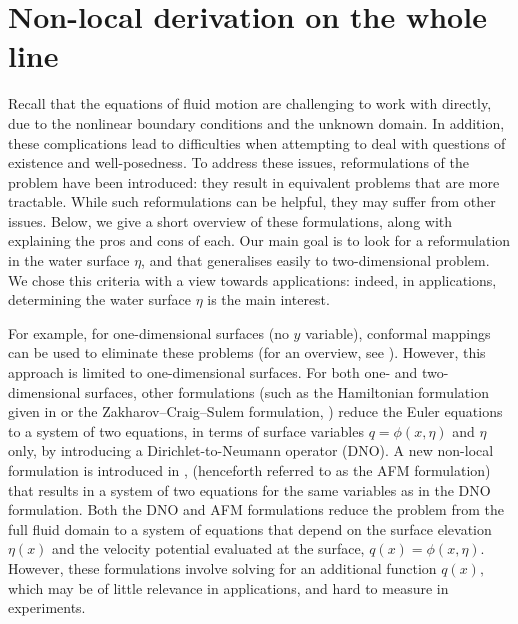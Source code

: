 
\chapter{Non-local derivation on the whole line} %

\label{Chapter3} %

Recall that the equations of fluid motion are challenging to work with directly, due to the nonlinear boundary conditions and the unknown domain. In addition, these complications lead to difficulties when attempting to deal with questions of existence and well-posedness. To address these issues, reformulations of the problem have been introduced: they result in equivalent problems that are more tractable. While such reformulations can be helpful, they may suffer from other issues. Below, we give a short overview of these formulations, along with explaining the pros and cons of each. Our main goal is to look for a reformulation in the water surface $\eta$, and that generalises easily to two-dimensional problem. We chose this criteria with a view towards applications: indeed, in applications, determining the water surface $\eta$ is the main interest.

For example, for one-dimensional surfaces (no $y$ variable), conformal mappings can be used to eliminate these problems (for an overview, see \cite{DKSZ1996}). However, this approach is limited to one-dimensional surfaces. For both one- and two-dimensional surfaces, other formulations (such as the Hamiltonian formulation given in  \cite{Zakharov} or the Zakharov–Craig–Sulem formulation, \cite{CS1993}) reduce the Euler equations to a system of two equations, in terms of surface variables $q = \phi(x, \eta)$ and $\eta$ only, by introducing a Dirichlet-to-Neumann operator (DNO). A new non-local formulation is introduced in \cite{AFM2006}, (henceforth referred to as the AFM formulation) that results in a system of two equations for the same variables as in the DNO formulation. Both the DNO and AFM formulations reduce the problem from the full fluid domain to a system of equations that depend on the surface elevation $\eta(x)$ and the velocity potential evaluated at the surface, $q(x) = \phi(x, \eta).$ However, these formulations involve solving for an additional function $q(x),$ which may be of little relevance in applications, and hard to measure in experiments.

